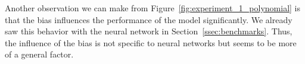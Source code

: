 Another observation we can make from Figure~\ref{fig:experiment_1_polynomial} is that the bias influences the performance of the model significantly. We already saw this behavior with the neural network in Section~\ref{ssec:benchmarks}. Thus, the influence of the bias is not specific to neural networks but seems to be more of a general factor.

